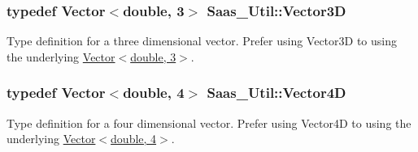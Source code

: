 \subsubsection[{Vector3\+D}]{\setlength{\rightskip}{0pt plus 5cm}typedef {\bf Vector}$<$double, 3$>$ {\bf Saas\+\_\+\+Util\+::\+Vector3\+D}}\label{namespace_saas___util_aa7cd6c60d40d077fa462d922096a5234}
Type definition for a three dimensional vector. Prefer using Vector3\+D to using the underlying \hyperlink{struct_saas___util_1_1_vector_3_01double_00_013_01_4}{Vector$<$double, 3$>$}. \hypertarget{namespace_saas___util_a10ff8b47bd08ba3f577c6fbbce374c7c}{}
\subsubsection[{Vector4\+D}]{\setlength{\rightskip}{0pt plus 5cm}typedef {\bf Vector}$<$double, 4$>$ {\bf Saas\+\_\+\+Util\+::\+Vector4\+D}}\label{namespace_saas___util_a10ff8b47bd08ba3f577c6fbbce374c7c}
Type definition for a four dimensional vector. Prefer using Vector4\+D to using the underlying \hyperlink{struct_saas___util_1_1_vector_3_01double_00_014_01_4}{Vector$<$double, 4$>$}. 